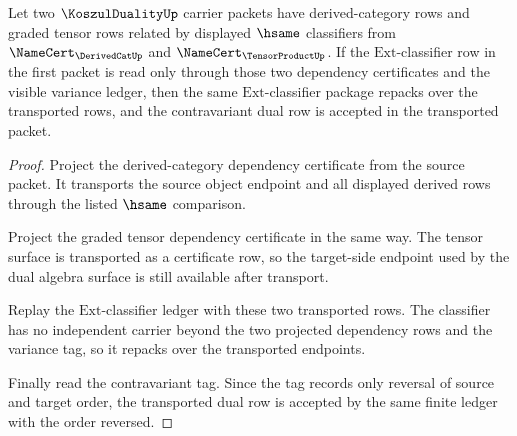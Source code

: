 \begin{theorem}
\label{thm:koszulduality-ext-classifier-stability}
Let two $\KoszulDualityUp$ carrier packets have derived-category rows and
graded tensor rows related by displayed $\hsame$ classifiers from
$\NameCert_{\DerivedCatUp}$ and $\NameCert_{\TensorProductUp}$. If the
$\mathrm{Ext}$-classifier row in the first packet is read only through those
two dependency certificates and the visible variance ledger, then the same
$\mathrm{Ext}$-classifier package repacks over the transported rows, and the
contravariant dual row is accepted in the transported packet.
\end{theorem}
\begin{proof}
Project the derived-category dependency certificate from the source packet.
It transports the source object endpoint and all displayed derived rows through
the listed $\hsame$ comparison.

Project the graded tensor dependency certificate in the same way. The tensor
surface is transported as a certificate row, so the target-side endpoint used
by the dual algebra surface is still available after transport.

Replay the $\mathrm{Ext}$-classifier ledger with these two transported rows.
The classifier has no independent carrier beyond the two projected dependency
rows and the variance tag, so it repacks over the transported endpoints.

Finally read the contravariant tag. Since the tag records only reversal of
source and target order, the transported dual row is accepted by the same
finite ledger with the order reversed.
\end{proof}

